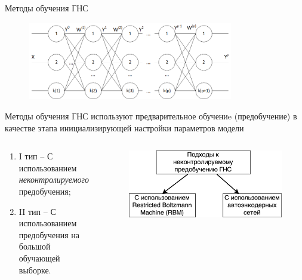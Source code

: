 \documentclass[10pt]{beamer}
\begin{document}
        \begin{frame}{Методы обучения ГНС}
            \begin{figure}[H]
                  \centering
                  \includegraphics[width=0.8\textwidth]{pic1-1.png}
            \end{figure}
            Методы обучения ГНС используют предварительное обучениe (предобучение) в качестве этапа инициализирующей настройки параметров модели
            \begin{columns}
                \begin{column}{0.55\textwidth}
                    \begin{enumerate}
                        \item I тип -- С использованием \textit{неконтролируемого} предобучения;
                        \item II тип -- С использованием предобучения на большой обучающей выборке.
                    \end{enumerate}
                \end{column}
                \begin{column}{0.45\textwidth}
                    \begin{figure}[H]
                        \centering
                        \includegraphics[width=1\textwidth]{pretrain_approaches.png}
                    \end{figure}
                \end{column}
            \end{columns}
        \end{frame}
\end{document}
